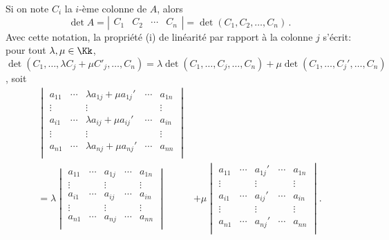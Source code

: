 \documentclass[class=report,crop=false]{standalone}
\begin{document}
Si on note $C_{i}$ la $i$-ème colonne de $A$, alors
$$\det A=\left|\begin{matrix}
C_1&C_2&\cdots&C_n
\end{matrix}\right|
 = \det (C_1,C_2,\ldots,C_n) \,.
$$
Avec cette notation, la propriété (i) de linéarité par rapport à la colonne $j$ s'écrit:
pour tout $\lambda,\mu \in \Kk$,
$\det (C_1,\ldots,\lambda C_j + \mu C'_j,\ldots, C_n)
= \lambda  \det (C_1,\ldots,C_j,\ldots, C_n)+ \mu \det (C_1,\ldots,C_j',\ldots, C_n)$, soit
\begin{align*}
\begin{vmatrix}
a_{11} & \cdots & \lambda a_{1j}+\mu a_{1j}' & \cdots & a_{1n} \\
\vdots &        &       \vdots                &        & \vdots\\
a_{i1} & \cdots & \lambda a_{ij}+\mu a_{ij}' & \cdots & a_{in} \\
\vdots &        &       \vdots                &        & \vdots\\
a_{n1} & \cdots & \lambda a_{nj}+\mu a_{nj}' & \cdots & a_{nn} \\
\end{vmatrix}&\\
= 
\lambda \begin{vmatrix}
a_{11} & \cdots &  a_{1j} & \cdots & a_{1n} \\
\vdots &        &       \vdots                &        & \vdots\\
a_{i1} & \cdots & a_{ij} & \cdots & a_{in} \\
\vdots &        &       \vdots                &        & \vdots\\
a_{n1} & \cdots & a_{nj} & \cdots & a_{nn} \\
\end{vmatrix}
& +
\mu \begin{vmatrix}
a_{11} & \cdots & a_{1j}' & \cdots & a_{1n} \\
\vdots &        &       \vdots                &        & \vdots\\
a_{i1} & \cdots & a_{ij}' & \cdots & a_{in} \\
\vdots &        &       \vdots                &        & \vdots\\
a_{n1} & \cdots & a_{nj}' & \cdots & a_{nn} \\
\end{vmatrix}.
\end{align*}
\end{document}
